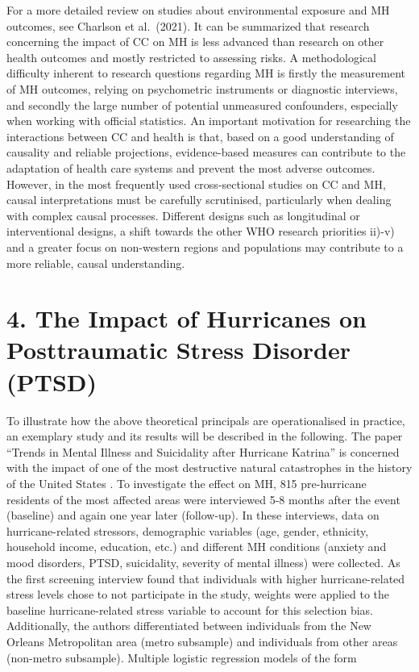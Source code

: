 \documentclass[
]{krantz}
\begin{document}
For a more detailed review on studies about environmental exposure and MH outcomes, see Charlson et al.~(2021).
It can be summarized that research concerning the impact of CC on MH is less advanced than research on other health outcomes and mostly restricted to assessing risks. A methodological difficulty inherent to research questions regarding MH is firstly the measurement of MH outcomes, relying on psychometric instruments or diagnostic interviews, and secondly the large number of potential unmeasured confounders, especially when working with official statistics.
An important motivation for researching the interactions between CC and health is that, based on a good understanding of causality and reliable projections, evidence-based measures can contribute to the adaptation of health care systems and prevent the most adverse outcomes. However, in the most frequently used cross-sectional studies on CC and MH, causal interpretations must be carefully scrutinised, particularly when dealing with complex causal processes. Different designs such as longitudinal or interventional designs, a shift towards the other WHO research priorities ii)-v) and a greater focus on non-western regions and populations may contribute to a more reliable, causal understanding.

\section{4. The Impact of Hurricanes on Posttraumatic Stress Disorder (PTSD)}\label{the-impact-of-hurricanes-on-posttraumatic-stress-disorder-ptsd}

To illustrate how the above theoretical principals are operationalised in practice, an exemplary study and its results will be described in the following. The paper ``Trends in Mental Illness and Suicidality after Hurricane Katrina'' \citep{kesslerTrendsMentalIllness2008} is concerned with the impact of one of the most destructive natural catastrophes in the history of the United States \citep{graumannHurricaneKatrinaClimatological2006}. To investigate the effect on MH, 815 pre-hurricane residents of the most affected areas were interviewed 5-8 months after the event (baseline) and again one year later (follow-up). In these interviews, data on hurricane-related stressors, demographic variables (age, gender, ethnicity, household income, education, etc.) and different MH conditions (anxiety and mood disorders, PTSD, suicidality, severity of mental illness) were collected. As the first screening interview found that individuals with higher hurricane-related stress levels chose to not participate in the study, weights were applied to the baseline hurricane-related stress variable to account for this selection bias. Additionally, the authors differentiated between individuals from the New Orleans Metropolitan area (metro subsample) and individuals from other areas (non-metro subsample). Multiple logistic regression models of the form
\end{document}

